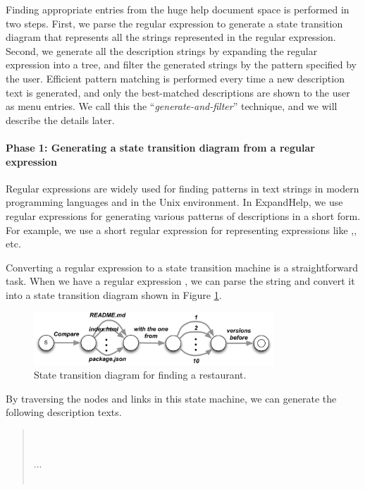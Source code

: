 \documentclass{sigchi}
\def\EH{\textsf{ExpandHelp}}
\begin{document}
Finding appropriate entries from the huge help document space is performed in two steps.
First, we parse the regular expression to
generate a state transition diagram that represents all the strings represented
in the regular expression.
Second, we generate all the description strings by expanding the regular expression
into a tree, and filter the generated strings by the pattern specified by the user.
Efficient pattern matching is performed every time a new description text is generated,
and only the best-matched descriptions are shown to the user as menu entries.
We call this the ``\textit{generate-and-filter}'' technique,
and we will describe the details later.

\paragraph{Phase 1: Generating a state transition diagram from a regular expression}

Regular expressions are widely used for finding patterns in text strings
in modern programming languages and in the Unix environment.
In {\EH}, we use regular expressions for
generating various patterns of descriptions in a short form.
For example, we use a short regular expression
for representing expressions like
,, etc.

Converting a regular expression to a state transition machine is a straightforward task.
When we have a regular expression
, 
we can parse the string and convert it into a state transition diagram
shown in Figure \ref{statemachine1}.

\begin{figure}[htb]
\includegraphics[width=90mm,bb=0 0 571 126]{figures/statemachine.pdf}
\caption{State transition diagram for finding a restaurant.}
\label{statemachine1}
\end{figure}

By traversing the nodes and links in this state machine,
we can generate the following description texts.

\begin{quote}
\small
{} \\
 \\
...\\
\\
\end{quote}
\end{document}
